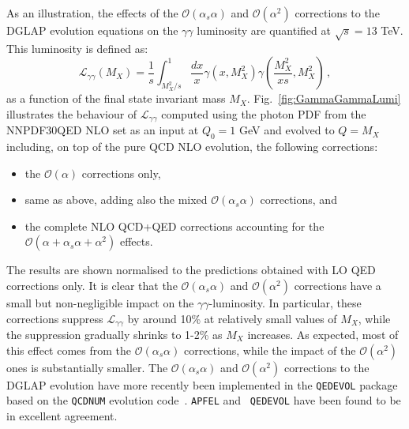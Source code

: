 As an illustration, the effects of the
$\mathcal{O}(\alpha_s\alpha)$ and $\mathcal{O}(\alpha^2)$ corrections
to the DGLAP evolution equations on the $\gamma\gamma$ luminosity are quantified at
$\sqrt{s} = 13$ TeV. This luminosity is defined as:
\begin{equation}\label{eq:GammaGammaLumi}
  \mathcal{L}_{\gamma\gamma}(M_X) = \frac1{s}\int_{M_X^2/s}^1
  \frac{dx}{x} \gamma(x,M_X^2) \gamma\left(\frac{M_X^2}{xs},M_X^2\right)\,,
\end{equation}
as a function of the final state invariant mass $M_X$.
%
Fig.~\ref{fig:GammaGammaLumi} illustrates the behaviour of
$\mathcal{L}_{\gamma\gamma}$ computed using the photon PDF from the
NNPDF30QED NLO set as an input at $Q_0 = 1$ GeV and evolved to $Q=M_X$
including, on top of the pure QCD NLO evolution, the following
corrections:
\begin{itemize}
\item the $\mathcal{O}(\alpha)$ corrections only,
\item same as above, adding also the mixed
  $\mathcal{O}(\alpha_s\alpha)$ corrections, and
\item the complete NLO QCD+QED corrections accounting for the
  $\mathcal{O}(\alpha+\alpha_s\alpha+\alpha^2)$ effects.
\end{itemize}
The results are shown normalised to the predictions obtained with LO
QED corrections only.
%
It is clear that the $\mathcal{O}(\alpha_s\alpha)$ and
$\mathcal{O}(\alpha^2)$ corrections have a small but non-negligible
impact on the $\gamma\gamma$-luminosity. In particular, these
corrections suppress $\mathcal{L}_{\gamma\gamma}$ by around 10\% at
relatively small values of $M_X$, while the suppression gradually
shrinks to 1-2\% as $M_X$ increases. As expected, most of this effect
comes from the $\mathcal{O}(\alpha_s\alpha)$ corrections, while the
impact of the $\mathcal{O}(\alpha^2)$ ones is substantially smaller.
The $\mathcal{O}(\alpha_s\alpha)$ and $\mathcal{O}(\alpha^2)$
corrections to the DGLAP evolution have more recently been implemented
in the {\tt QEDEVOL} package~\cite{Sadykov:2014aua} based on the
{\tt QCDNUM} evolution code~\cite{Botje:2010ay}. {\tt APFEL} and {\tt
  QEDEVOL} have been found to be in excellent agreement.

